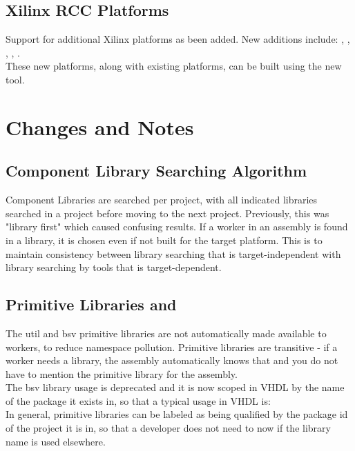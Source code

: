 \subsection{Xilinx RCC Platforms}
\label{sec:20_xilinx_rcc_platforms}
Support for additional Xilinx platforms as been added. New additions include: , , , , .\\

These new platforms, along with existing platforms, can be built using the new  tool.


\section{Changes and Notes}

\subsection{Component Library Searching Algorithm}
\label{sec:20_component_library_searching}
Component Libraries are searched per project, with all indicated libraries searched in a project before moving to the next project. Previously, this was "library first" which caused confusing results. If a worker in an assembly is found in a library, it is chosen even if not built for the target platform. This is to maintain consistency between library searching that is target-independent with library searching by tools that is target-dependent.

\subsection{Primitive Libraries  and }
\label{sec:20_util_bsv_library}
The util and bsv primitive libraries are not automatically made available to workers, to reduce namespace pollution. Primitive libraries are transitive - if a worker needs a library, the assembly automatically knows that and you do not have to mention the primitive library for the assembly.\\

The bsv library usage is deprecated and it is now scoped in VHDL by the name of the package it exists in, so that a typical usage in VHDL is: \\

In general, primitive libraries can be labeled as being qualified by the package id of the project it is in, so that a developer does not need to now if the library name is used elsewhere.

